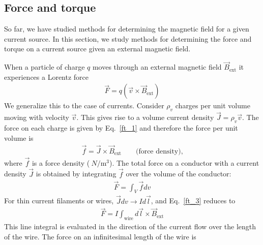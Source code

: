 \documentclass[12pt,a4paper,oneside]{book}
\begin{document}
\begin{onehalfspace}
\subsection{Force and torque}
So far, we have studied methods for determining the magnetic field for a given current source. In this section, we study methods for determining the force and torque on a current source given an external magnetic field.

When a particle of charge $q$ moves through an external magnetic field $\vec{B}_{\text{ext}}$ it experiences a Lorentz force
\begin{equation}\label{ft_1}
	\begin{aligned}
		\vec{F}=q(\vec{v}\times\vec{B}_{\text{ext}})
	\end{aligned}
\end{equation}
 We generalize this to the case of currents. Consider $\rho_v$ charges per unit volume moving with velocity $\vec{v}$. This gives rise to a volume current density $\vec{J}=\rho_v\vec{v}$. The force on each charge is given by Eq.~\eqref{ft_1} and therefore the force per unit volume is
 \begin{equation}\label{ft_2}
 	\begin{aligned}
 		\vec{f}=\vec{J}\times\vec{B}_{\text{ext}}\qquad\text{(force density),}
 	\end{aligned}
 \end{equation}
where $\vec{f}$ is a force density ($\SI{}{N\per\cubic\meter}$). The total force on a conductor with a current density $\vec{J}$ is obtained by integrating $\vec{f}$ over the volume of the conductor: 
\begin{equation}\label{ft_3}
	\begin{aligned}
		\vec{F}=\int_{V}\vec{f}dv
	\end{aligned}
\end{equation}
For thin current filaments or wires, $\vec{J}dv\rightarrow Id\vec{l}$, and Eq.~\eqref{ft_3} reduces to 
\begin{equation}\label{ft_4}
\boxed{	\begin{aligned}
		\vec{F}=I\int_{\text{wire}}d\vec{l}\times\vec{B}_{\text{ext}}
	\end{aligned}}
\end{equation}
This line integral is evaluated in the direction of the current flow over the length of the wire. The force on an infinitesimal length of the wire is
 \begin{equation}\label{ft_5}
 	\begin{aligned}

\end{aligned}
\end{equation}
\end{onehalfspace}
\end{document}
